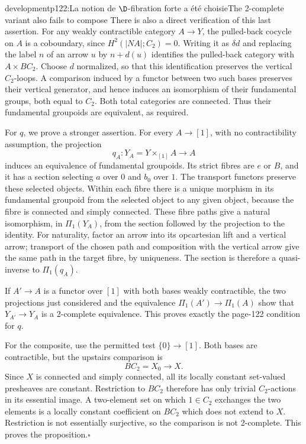 \begin{dcomment}{development}{p122:La notion de $\D$-fibration forte a été choisie}{The 2-complete variant also fails to compose}
There is also a direct verification of this last assertion. For any weakly contractible category $A\to Y$, the pulled-back cocycle on $A$ is a coboundary, since $H^2(|NA|;C_2)=0$. Writing it as $\delta d$ and replacing the label $n$ of an arrow $u$ by $n+d(u)$ identifies the pulled-back category with $A\times BC_2$. Choose $d$ normalized, so that this identification preserves the vertical $C_2$-loops. A comparison induced by a functor between two such bases preserves their vertical generator, and hence induces an isomorphism of their fundamental groups, both equal to $C_2$. Both total categories are connected. Thus their fundamental groupoids are equivalent, as required.

For $q$, we prove a stronger assertion. For every $A\to[1]$, with no contractibility assumption, the projection
\[
 q_A:Y_A=Y\times_{[1]}A\longrightarrow A
\]
induces an equivalence of fundamental groupoids. Its strict fibres are $e$ or $B$, and it has a section selecting $a$ over $0$ and $b_0$ over $1$. The transport functors preserve these selected objects. Within each fibre there is a unique morphism in its fundamental groupoid from the selected object to any given object, because the fibre is connected and simply connected. These fibre paths give a natural isomorphism, in $\Pi_1(Y_A)$, from the section followed by the projection to the identity. For naturality, factor an arrow into its opcartesian lift and a vertical arrow; transport of the chosen path and composition with the vertical arrow give the same path in the target fibre, by uniqueness. The section is therefore a quasi-inverse to $\Pi_1(q_A)$.

If $A'\to A$ is a functor over $[1]$ with both bases weakly contractible, the two projections just considered and the equivalence $\Pi_1(A')\to\Pi_1(A)$ show that $Y_{A'}\to Y_A$ is a 2-complete equivalence. This proves exactly the page-122 condition for $q$.

For the composite, use the permitted test $\{0\}\to[1]$. Both bases are contractible, but the upstairs comparison is
\[
 BC_2=X_0\longrightarrow X.
\]
Since $X$ is connected and simply connected, all its locally constant set-valued presheaves are constant. Restriction to $BC_2$ therefore has only trivial $C_2$-actions in its essential image. A two-element set on which $1\in C_2$ exchanges the two elements is a locally constant coefficient on $BC_2$ which does not extend to $X$. Restriction is not essentially surjective, so the comparison is not 2-complete. This proves the proposition.\hfill$\square$


\end{dcomment}
